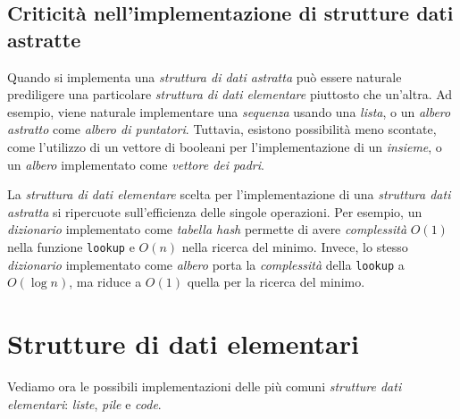 \subsection{Criticità nell'implementazione di strutture dati astratte}
Quando si implementa una \emph{struttura di dati astratta} può essere naturale
prediligere una particolare \emph{struttura di dati elementare} piuttosto che
un'altra. Ad esempio, viene naturale implementare una \emph{sequenza}
usando una \emph{lista}, o un \emph{albero astratto} come \emph{albero di
puntatori}. Tuttavia, esistono possibilità meno scontate, come l'utilizzo di
un vettore di booleani per l'implementazione di un \emph{insieme}, o un
\emph{albero} implementato come \emph{vettore dei padri}.

La \emph{struttura di dati elementare} scelta per l'implementazione di una
\emph{struttura dati astratta} si ripercuote sull'efficienza delle singole
operazioni. Per esempio, un \emph{dizionario} implementato come \emph{tabella
hash} permette di avere \emph{complessità} $O(1)$ nella funzione \texttt{lookup}
e $O(n)$ nella ricerca del minimo. Invece, lo stesso \emph{dizionario}
implementato come \emph{albero} porta la \emph{complessità} della \texttt{lookup}
a $O(\log n)$, ma riduce a $O(1)$ quella per la ricerca del minimo.

\newpage
\section{Strutture di dati elementari}
Vediamo ora le possibili implementazioni delle più comuni \emph{strutture
dati elementari}: \emph{liste}, \emph{pile} e \emph{code}.

